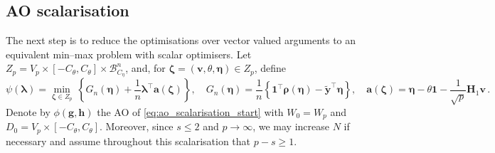 \documentclass{article}
\makeatletter
\theoremstyle{definition}
\newcommand{\vnorm}[1]{%
	\ensuremath{%
		\if@display
		\left\| #1 \right\|
		\else
		\| #1 \|
		\fi
	}%
}
\newcommand*{\bb}{\boldsymbol}
\def\bw {\bb{w}}
\def\bH {\bb{H}}
\def\bv{\bb{v}}
\def\bh{\bb{h}}
\def\bg{\bb{g}}
\def\bYtil{\widetilde{\bb{y}}}
\def\bH{\bb{H}}
\def\blambda{\bb{\lambda}}
\makeatother
\begin{document}
\begin{bibunit}
\subsection{AO scalarisation} \label{sec:ao-scalar}

The next step is to reduce the optimisations over vector valued arguments to an equivalent min--max problem with scalar optimisers.
Let $Z_p
	=
	V_p
	\times
	[-C_\theta,C_\theta]
	\times
	\mathcal B^n_{C_\eta}$,
and, for $\bb{\zeta}=(\bv,\theta,\bb\eta)\in Z_p$, define
\begin{equation}
	\label{eq:ao_scalarisation_psi_def}
	\psi(\blambda)
	=
	\underset{\bb{\zeta}\in Z_p}{\min} \,
	\left\{
		G_n(\bb\eta)
		+
		\frac{1}{n}
		\blambda^\top
		\bb a (\bb \zeta)
	\right\} , \quad
	G_n(\bb\eta)
	=
	\frac{1}{n}
	\left\{
		\bb 1^\top\bb\rho(\bb\eta)
		-
		\bYtil^\top\bb\eta
	\right\},
	\quad
	\bb a (\bb \zeta)
	=
	\bb\eta
	-
	\theta\bb 1
	-
	\frac{1}{\sqrt p}
	\bH_1\bv \,.
\end{equation}
Denote by $\phi(\bg,\bh)$ the AO of \eqref{eq:ao_scalarisation_start} with 
$W_0 = W_p$ and $D_0 = V_p\times[-C_\theta, C_\theta]$.
Moreover, since $s\le 2$ and $p\to\infty$, we may increase $N$ if necessary
and assume throughout this scalarisation that $p-s\ge 1$.


\end{bibunit}
\end{document}
